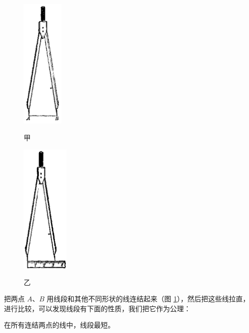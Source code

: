 \begin{figure}[htbp]
    \centering
    \begin{minipage}[b]{7cm}
        \begin{minipage}[b]{3cm}
            \centering
            \includegraphics[width=2cm]{../pic/czjh1-ch1-13-a.png}
            \caption*{甲}
        \end{minipage}
        \qquad
        \begin{minipage}[b]{3cm}
            \centering
            \includegraphics[width=2.3cm]{../pic/czjh1-ch1-13-b.png}
            \caption*{乙}
        \end{minipage}
        \caption{}\label{fig:czjh1-1-13}
    \end{minipage}
    \qquad
    \begin{minipage}[b]{7cm}
        \centering
        
        \caption{}\label{fig:czjh1-1-14}
    \end{minipage}
\end{figure}


把两点 $A$、$B$ 用线段和其他不同形状的线连结起来（图 \ref{fig:czjh1-1-14}），然后把这些线拉直，
进行比较，可以发现线段有下面的性质，我们把它作为公理：

\begin{gongli}[公理]\label{theorem:ldzjxdzd}
    在所有连结两点的线中，线段最短。
\end{gongli}

